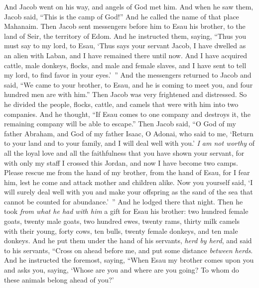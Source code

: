 \begin{biblechapter} %
 And Jacob went on his way, and angels of God met him.
\verse And when he saw them, Jacob said, “This is the camp of God!” And he called the name of that place Mahanaim.
\verse Then Jacob sent messengers before him to Esau his brother, to the land of Seir, the territory of Edom.
\verse And he instructed them, saying, “Thus you must say to my lord, to Esau, ‘Thus says your servant Jacob, I have dwelled as an alien with Laban, and I have remained there until now.
\verse And I have acquired cattle, male donkeys, flocks, and male and female slaves, and I have sent to tell my lord, to find favor in your eyes.’ ”
\verse And the messengers returned to Jacob and said, “We came to your brother, to Esau, and he is coming to meet you, and four hundred men are with him.”
\verse Then Jacob was very frightened and distressed. So he divided the people, flocks, cattle, and camels that were with him into two companies.
\verse And he thought, “If Esau comes to one company and destroys it, the remaining company will be able to escape.”
\verse Then Jacob said, “O God of my father Abraham, and God of my father Isaac, O Adonai, who said to me, ‘Return to your land and to your family, and I will deal well with you.’
\verse \textit{I am not worthy} of all the loyal love and all the faithfulness that you have shown your servant, for with only my staff I crossed this Jordan, and now I have become two camps.
\verse Please rescue me from the hand of my brother, from the hand of Esau, for I fear him, lest he come and attack mother and children alike.
\verse Now you yourself said, ‘I will surely deal well with you and make your offspring as the sand of the sea that cannot be counted for abundance.’ ”
\verse And he lodged there that night. Then he took \textit{from what he had with him} a gift for Esau his brother:
\verse two hundred female goats, twenty male goats, two hundred ewes, twenty rams,
\verse thirty milk camels with their young, forty cows, ten bulls, twenty female donkeys, and ten male donkeys.
\verse And he put them under the hand of his servants, \textit{herd by herd}, and said to his servants, “Cross on ahead before me, and put some distance \textit{between herds}.
\verse And he instructed the foremost, saying, “When Esau my brother comes upon you and asks you, saying, ‘Whose are you and where are you going? To whom do these animals belong ahead of you?’

\end{biblechapter}
